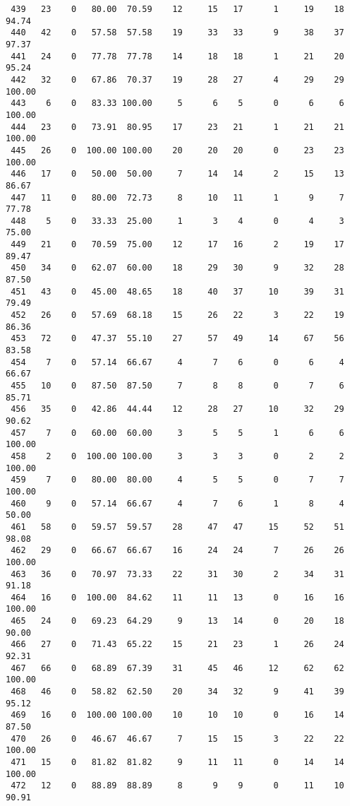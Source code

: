 \begin{verbatim}
 439   23    0   80.00  70.59    12     15   17      1     19    18    94.74
 440   42    0   57.58  57.58    19     33   33      9     38    37    97.37
 441   24    0   77.78  77.78    14     18   18      1     21    20    95.24
 442   32    0   67.86  70.37    19     28   27      4     29    29   100.00
 443    6    0   83.33 100.00     5      6    5      0      6     6   100.00
 444   23    0   73.91  80.95    17     23   21      1     21    21   100.00
 445   26    0  100.00 100.00    20     20   20      0     23    23   100.00
 446   17    0   50.00  50.00     7     14   14      2     15    13    86.67
 447   11    0   80.00  72.73     8     10   11      1      9     7    77.78
 448    5    0   33.33  25.00     1      3    4      0      4     3    75.00
 449   21    0   70.59  75.00    12     17   16      2     19    17    89.47
 450   34    0   62.07  60.00    18     29   30      9     32    28    87.50
 451   43    0   45.00  48.65    18     40   37     10     39    31    79.49
 452   26    0   57.69  68.18    15     26   22      3     22    19    86.36
 453   72    0   47.37  55.10    27     57   49     14     67    56    83.58
 454    7    0   57.14  66.67     4      7    6      0      6     4    66.67
 455   10    0   87.50  87.50     7      8    8      0      7     6    85.71
 456   35    0   42.86  44.44    12     28   27     10     32    29    90.62
 457    7    0   60.00  60.00     3      5    5      1      6     6   100.00
 458    2    0  100.00 100.00     3      3    3      0      2     2   100.00
 459    7    0   80.00  80.00     4      5    5      0      7     7   100.00
 460    9    0   57.14  66.67     4      7    6      1      8     4    50.00
 461   58    0   59.57  59.57    28     47   47     15     52    51    98.08
 462   29    0   66.67  66.67    16     24   24      7     26    26   100.00
 463   36    0   70.97  73.33    22     31   30      2     34    31    91.18
 464   16    0  100.00  84.62    11     11   13      0     16    16   100.00
 465   24    0   69.23  64.29     9     13   14      0     20    18    90.00
 466   27    0   71.43  65.22    15     21   23      1     26    24    92.31
 467   66    0   68.89  67.39    31     45   46     12     62    62   100.00
 468   46    0   58.82  62.50    20     34   32      9     41    39    95.12
 469   16    0  100.00 100.00    10     10   10      0     16    14    87.50
 470   26    0   46.67  46.67     7     15   15      3     22    22   100.00
 471   15    0   81.82  81.82     9     11   11      0     14    14   100.00
 472   12    0   88.89  88.89     8      9    9      0     11    10    90.91

\end{verbatim}
